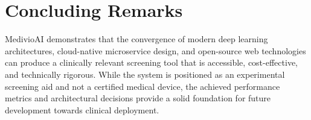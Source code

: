 \documentclass[12pt, a4paper, oneside]{report}
\begin{document}
\section{Concluding Remarks}
\label{sec:concluding}

MedivioAI demonstrates that the convergence of modern deep learning architectures, cloud-native microservice design, and open-source web technologies can produce a clinically relevant screening tool that is accessible, cost-effective, and technically rigorous. While the system is positioned as an experimental screening aid and not a certified medical device, the achieved performance metrics and architectural decisions provide a solid foundation for future development towards clinical deployment.

\newpage
{}
\end{document}
